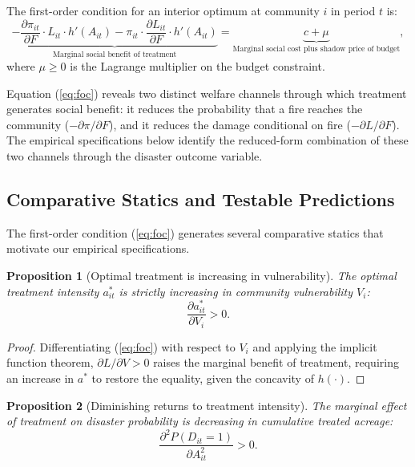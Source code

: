 \documentclass[12pt, letterpaper]{article}
\newtheorem{proposition}{Proposition}
\begin{document}
The first-order condition for an interior optimum at community $i$ in period $t$ is:
\begin{equation}
\underbrace{-\frac{\partial \pi_{it}}{\partial F} \cdot L_{it} \cdot h'(A_{it}) - \pi_{it} \cdot \frac{\partial L_{it}}{\partial F} \cdot h'(A_{it})}_{\text{Marginal social benefit of treatment}} = \underbrace{c + \mu}_{\text{Marginal social cost plus shadow price of budget}},
\label{eq:foc}
\end{equation}
where $\mu \geq 0$ is the Lagrange multiplier on the budget constraint.

Equation (\ref{eq:foc}) reveals two distinct welfare channels through which treatment generates social benefit: it reduces the probability that a fire reaches the community ($-\partial \pi / \partial F$), and it reduces the damage conditional on fire ($-\partial L / \partial F$). The empirical specifications below identify the reduced-form combination of these two channels through the disaster outcome variable.

\subsection{Comparative Statics and Testable Predictions}

The first-order condition (\ref{eq:foc}) generates several comparative statics that motivate our empirical specifications.

\begin{proposition}[Optimal treatment is increasing in vulnerability]
\label{prop:vulnerability}
The optimal treatment intensity $a^*_{it}$ is strictly increasing in community vulnerability $V_i$:
$$\frac{\partial a^*_{it}}{\partial V_i} > 0.$$
\end{proposition}

\begin{proof}
Differentiating (\ref{eq:foc}) with respect to $V_i$ and applying the implicit function theorem, $\partial L / \partial V > 0$ raises the marginal benefit of treatment, requiring an increase in $a^*$ to restore the equality, given the concavity of $h(\cdot)$.
\end{proof}

\begin{proposition}[Diminishing returns to treatment intensity]
\label{prop:diminishing}
The marginal effect of treatment on disaster probability is decreasing in cumulative treated acreage:
$$\frac{\partial^2 P(D_{it} = 1)}{\partial A_{it}^2} > 0.$$
\end{proposition}
\end{document}
